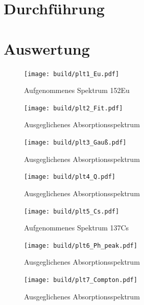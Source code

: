 
\section{Durchführung}


\section{Auswertung}

\begin{figure}
    \centering
    \texttt{[image: build/plt1\_Eu.pdf]}
	\caption{Aufgenommenes Spektrum 152Eu}\label{fig:Eu_spektrum}
\end{figure}

\begin{figure}
    \centering
    \texttt{[image: build/plt2\_Fit.pdf]}
	\caption{Ausgeglichenes Absorptionsspektrum}\label{fig:Eu_Fit}
\end{figure}

\begin{figure}
    \centering
    \texttt{[image: build/plt3\_Gauß.pdf]}
	\caption{Ausgeglichenes Absorptionsspektrum}\label{fig:Gauß}
\end{figure}

\begin{figure}
    \centering
    \texttt{[image: build/plt4\_Q.pdf]}
	\caption{Ausgeglichenes Absorptionsspektrum}\label{fig:Eu_Q}
\end{figure}

\begin{figure}
    \centering
    \texttt{[image: build/plt5\_Cs.pdf]}
	\caption{Aufgenommenes Spektrum 137Cs}\label{fig:Cs_spektrum}
\end{figure}

\begin{figure}
    \centering
    \texttt{[image: build/plt6\_Ph\_peak.pdf]}
	\caption{Ausgeglichenes Absorptionsspektrum}\label{fig:Cs_peak}
\end{figure}

\begin{figure}
    \centering
    \texttt{[image: build/plt7\_Compton.pdf]}
	\caption{Ausgeglichenes Absorptionsspektrum}\label{fig:Compton}
\end{figure}

